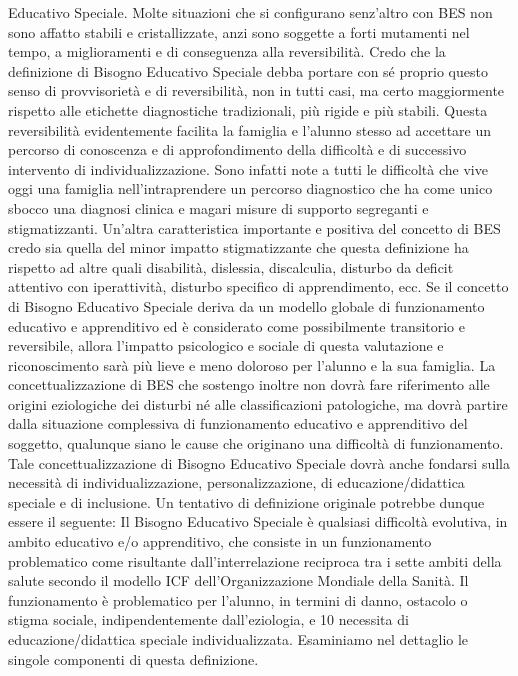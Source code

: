 Educativo Speciale. Molte situazioni che si configurano senz’altro con BES non sono affatto stabili e
cristallizzate, anzi sono soggette a forti mutamenti nel tempo, a miglioramenti e di conseguenza
alla reversibilità. Credo che la definizione di Bisogno Educativo Speciale debba portare con sé
proprio questo senso di provvisorietà e di reversibilità, non in tutti casi, ma certo maggiormente
rispetto alle etichette diagnostiche tradizionali, più rigide e più stabili. Questa reversibilità
evidentemente facilita la famiglia e l’alunno stesso ad accettare un percorso di conoscenza e di
approfondimento della difficoltà e di successivo intervento di individualizzazione. Sono infatti note
a tutti le difficoltà che vive oggi una famiglia nell’intraprendere un percorso diagnostico che ha
come unico sbocco una diagnosi clinica e magari misure di supporto segreganti e stigmatizzanti.
Un’altra caratteristica importante e positiva del concetto di BES credo sia quella del minor
impatto stigmatizzante che questa definizione ha rispetto ad altre quali disabilità, dislessia,
discalculia, disturbo da deficit attentivo con iperattività, disturbo specifico di apprendimento, ecc.
Se il concetto di Bisogno Educativo Speciale deriva da un modello globale di funzionamento
educativo e apprenditivo ed è considerato come possibilmente transitorio e reversibile, allora
l’impatto psicologico e sociale di questa valutazione e riconoscimento sarà più lieve e meno
doloroso per l’alunno e la sua famiglia.
La concettualizzazione di BES che sostengo inoltre non dovrà fare riferimento alle origini
eziologiche dei disturbi né alle classificazioni patologiche, ma dovrà partire dalla situazione
complessiva di funzionamento educativo e apprenditivo del soggetto, qualunque siano le cause
che originano una difficoltà di funzionamento.
Tale concettualizzazione di Bisogno Educativo Speciale dovrà anche fondarsi sulla necessità di
individualizzazione, personalizzazione, di educazione/didattica speciale e di inclusione.
Un tentativo di definizione originale potrebbe dunque essere il seguente:
Il Bisogno Educativo Speciale è qualsiasi difficoltà evolutiva, in ambito educativo e/o
apprenditivo, che consiste in un funzionamento problematico come risultante
dall’interrelazione reciproca tra i sette ambiti della salute secondo il modello ICF
dell’Organizzazione Mondiale della Sanità. Il funzionamento è problematico per l'alunno,
in termini di danno, ostacolo o stigma sociale, indipendentemente dall’eziologia, e
10
necessita di educazione/didattica speciale individualizzata.
Esaminiamo nel dettaglio le singole componenti di questa definizione.

